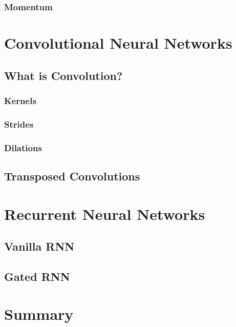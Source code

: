 \subsubsection{Momentum}




\section{Convolutional Neural Networks}
\subsection{What is Convolution?}
\subsubsection{Kernels}
\subsubsection{Strides}
\subsubsection{Dilations}
\subsection{Transposed Convolutions}


\section{Recurrent Neural Networks}
\subsection{Vanilla RNN}
\subsection{Gated RNN}




\section{Summary}
